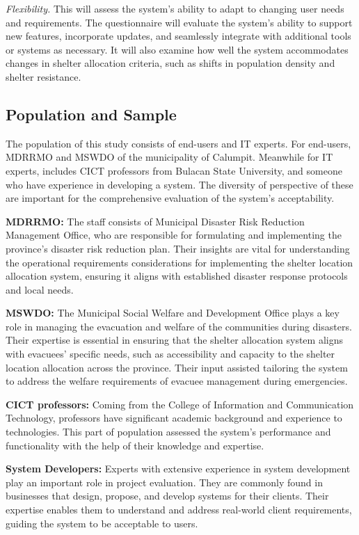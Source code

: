 	\textit{Flexibility.} This will assess the system’s ability to adapt to changing user needs and requirements. The questionnaire will evaluate the system's ability to support new features, incorporate updates, and seamlessly integrate with additional tools or systems as necessary. It will also examine how well the system accommodates changes in shelter allocation criteria, such as shifts in population density and shelter resistance.
	

\subsection{Population and Sample}
	The population of this study consists of end-users and IT experts. For end-users,  MDRRMO and MSWDO of the municipality of Calumpit. Meanwhile for IT experts, includes CICT professors from Bulacan State University, and someone who have experience in developing a system.  The diversity of perspective of these are important for the comprehensive evaluation of the system’s acceptability.
	
	\textbf{MDRRMO:} The staff consists of Municipal Disaster Risk Reduction Management Office, who are responsible for formulating and implementing the province's disaster risk reduction plan.  Their insights are vital for understanding the operational requirements considerations for implementing the shelter location allocation system, ensuring it aligns with established disaster response protocols and local needs.
	
	\textbf{MSWDO:} The Municipal Social Welfare and Development Office plays a key role in managing the evacuation and welfare of the communities during disasters. Their expertise is essential in ensuring that the shelter allocation system aligns with evacuees' specific needs, such as accessibility and capacity to the shelter location allocation across the province. Their input assisted tailoring the system to address the welfare requirements of evacuee management during emergencies.
	
	\textbf{CICT professors:} Coming from the College of Information and Communication Technology, professors have significant academic background and experience to technologies. This part of population assessed the system's performance and functionality with the help of their knowledge and expertise.
	
	\textbf{System Developers:} Experts with extensive experience in system development play an important role in project evaluation. They are commonly found in businesses that design, propose, and develop systems for their clients. Their expertise enables them to understand and address real-world client requirements, guiding the system to be acceptable to users.
	
